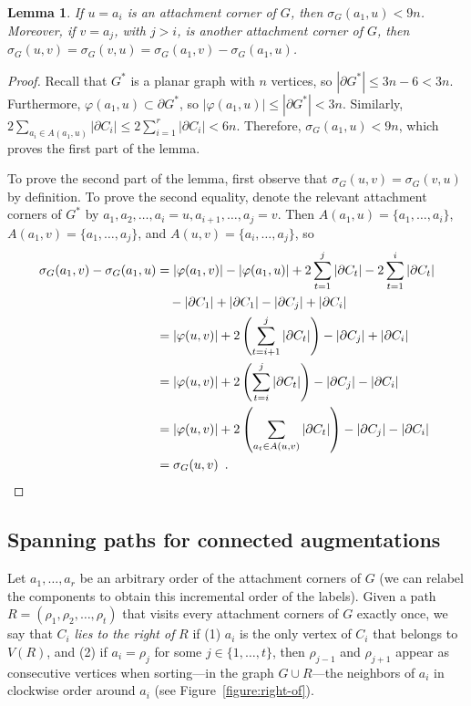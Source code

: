 \documentclass[11pt]{patmorin}
\newtheorem{lemma}[theorem]{Lemma}
\begin{document}
\begin{lemma}\label{lemma:Contained in integer grid}
    If $u=a_i$ is an attachment corner of $G$, then $\sigma_G(a_1, u) < 9n$. Moreover, if $v=a_j$, with $j> i$, is another attachment corner of $G$, then
  $\sigma_G(u, v) = \sigma_G(v, u) = \sigma_G(a_1, v)- \sigma_G(a_1, u)$.
\end{lemma}
\begin{proof}
Recall that $G^*$ is a planar graph with $n$ vertices, 
so $|\partial G^*|\le 3n-6<3n$.  
Furthermore, $\varphi(a_1,u)\subset
\partial G^*$, so $|\varphi(a_1,u)|\le |\partial G^*|< 3n$.  Similarly,
$2\sum_{a_i\in A(a_1,u)}|\partial C_i| \le 2\sum_{i=1}^r |\partial C_i| < 6n$.
Therefore, $\sigma_G(a_1,u)< 9n$, which proves the first part of the lemma.

To prove the second part of the lemma, first observe that $\sigma_G(u,v)=\sigma_G(v,u)$ by definition. To prove the second equality, denote
the relevant attachment corners of $G^*$ by
$a_1,a_2,\ldots,a_i=u,a_{i+1},\ldots,a_j=v$. Then $A(a_1,u)
= \{a_1,\ldots,a_i\}$, $A(a_1,v)=\{a_1,\ldots,a_j\}$, and
$A(u,v)=\{a_i,\ldots,a_j\}$, so
\begin{align*}
    \sigma_{G}(a_1,v)-\sigma_G(a_1,u) 
        & = |\varphi(a_1,v)|-|\varphi(a_1,u)| + 2\sum_{t=1}^j |\partial C_t|
         - 2\sum_{t=1}^i |\partial C_t|  \\
               & \quad {} - |\partial C_1|+|\partial C_1| 
                - |\partial C_j|+|\partial C_i| \\
        & = |\varphi(u,v)| + 2 \left (\sum_{t=i+1}^j |\partial C_t|\right) - |\partial C_j| + |\partial C_i| \\
        & = |\varphi(u,v)| + 2 \left (\sum_{t=i}^j |\partial C_t|\right) - |\partial C_j| - |\partial C_i| \\
        & = |\varphi(u,v)| + 2 \left (\sum_{a_t\in A(u,v)} |\partial C_t|\right) - |\partial C_j| - |\partial C_i| \\
        & = \sigma_G(u,v)  \enspace . \qedhere
\end{align*}
\end{proof}

\subsection{Spanning paths for connected augmentations}\label{section:Spanning paths for connected augmentations}
Let $a_1, \ldots, a_r$ be an arbitrary order of the attachment corners of $G$ (we can relabel the components to obtain this incremental order of the labels). 
Given a path $R = (\rho_1, \rho_2, \ldots, \rho_t)$ that visits every attachment corners of $G$ exactly once, we say that $C_i$ \emph{lies to the right of} $R$ if (1) $a_i$ is the only vertex of $C_i$ that belongs to $V(R)$, and (2) if $a_i = \rho_j$ for some $j\in\{1,\ldots,t\}$, then $\rho_{j-1}$ and $\rho_{j+1}$ appear as consecutive vertices when sorting---in the graph $G\cup R$---the neighbors of $a_i$ in clockwise order around $a_i$ (see Figure~\ref{figure:right-of}).
\end{document}
